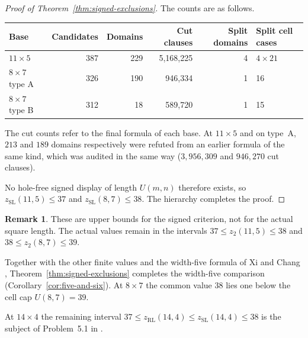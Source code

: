 \documentclass[11pt,a4paper]{article}
\theoremstyle{definition}
\newtheorem{remark}[theorem]{Remark}
\newcommand{\zr}{z_{\mathrm{RL}}}
\newcommand{\zs}{z_{\mathrm{SL}}}
\newcommand{\zt}{z_2}
\begin{document}
\begin{proof}[Proof of Theorem~\ref{thm:signed-exclusions}]
The counts are as follows.
\begin{center}
\begin{tabular}{lrrrrl}
\toprule
Base&Candidates&Domains&Cut clauses&Split domains&Split cell cases\\
\midrule
$11\times5$&387&229&5{,}168{,}225&4&$4\times21$\\
$8\times7$ type A&326&190&946{,}334&1&16\\
$8\times7$ type B&312&18&589{,}720&1&15\\
\bottomrule
\end{tabular}
\end{center}
The cut counts refer to the final formula of each base. At $11\times5$ and
on type~A, $213$ and $189$ domains respectively were refuted from an
earlier formula of the same kind, which was audited in the same way
($3{,}956{,}309$ and $946{,}270$ cut clauses).

No hole-free signed display of length $U(m,n)$ therefore exists, so
$\zs(11,5)\le37$ and $\zs(8,7)\le38$. The hierarchy completes the proof.
\end{proof}

\begin{remark}
These are upper bounds for the signed criterion, not for the actual
square length. The actual values remain in the intervals
$37\le\zt(11,5)\le38$ and $38\le\zt(8,7)\le39$.

Together with the other finite values and the width-five formula of
Xi and Chang \cite{XiChangFive},
Theorem~\ref{thm:signed-exclusions} completes the width-five comparison
(Corollary~\ref{cor:five-and-six}). At $8\times7$
the common value $38$ lies one below the cell cap $U(8,7)=39$.

At $14\times4$ the remaining interval
$37\le\zr(14,4)\le\zs(14,4)\le38$ is the subject of
Problem~5.1 in \cite{CC}.
\end{remark}
\end{document}
